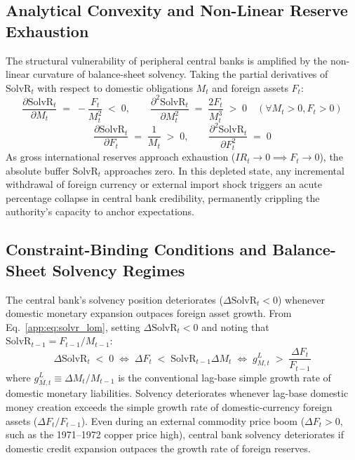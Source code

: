 \subsection{Analytical Convexity and Non-Linear Reserve Exhaustion}
\label{app:convexity}

The structural vulnerability of peripheral central banks is amplified by the non-linear curvature of balance-sheet solvency. Taking the partial derivatives of $\text{SolvR}_t$ with respect to domestic obligations $M_t$ and foreign assets $F_t$:
\begin{equation}
	\label{app:eq:solvr_derivatives}
	\frac{\partial \text{SolvR}_t}{\partial M_t} \;=\; -\frac{F_t}{M_t^2} \;<\; 0, \qquad \frac{\partial^2 \text{SolvR}_t}{\partial M_t^2} \;=\; \frac{2 F_t}{M_t^3} \;>\; 0 \quad (\forall M_t > 0, F_t > 0)
\end{equation}
\begin{equation}
	\frac{\partial \text{SolvR}_t}{\partial F_t} \;=\; \frac{1}{M_t} \;>\; 0, \qquad \frac{\partial^2 \text{SolvR}_t}{\partial F_t^2} \;=\; 0
\end{equation}
As gross international reserves approach exhaustion ($IR_t \to 0 \implies F_t \to 0$), the absolute buffer $\text{SolvR}_t$ approaches zero. In this depleted state, any incremental withdrawal of foreign currency or external import shock triggers an acute percentage collapse in central bank credibility, permanently crippling the authority's capacity to anchor expectations.

\subsection{Constraint-Binding Conditions and Balance-Sheet Solvency Regimes}
\label{app:constraint_cases}

The central bank's solvency position deteriorates ($\Delta\text{SolvR}_t < 0$) whenever domestic monetary expansion outpaces foreign asset growth. From Eq.~\eqref{app:eq:solvr_lom}, setting $\Delta\text{SolvR}_t < 0$ and noting that $\text{SolvR}_{t-1} = F_{t-1}/M_{t-1}$:
\begin{equation}
	\label{app:eq:binding}
	\Delta\text{SolvR}_t \;<\; 0 \;\iff\; \Delta F_t \;<\; \text{SolvR}_{t-1} \Delta M_t \;\iff\; g^L_{M,t} \;>\; \frac{\Delta F_t}{F_{t-1}}
\end{equation}
where $g^L_{M,t} \equiv \Delta M_t / M_{t-1}$ is the conventional lag-base simple growth rate of domestic monetary liabilities. Solvency deteriorates whenever lag-base domestic money creation exceeds the simple growth rate of domestic-currency foreign assets ($\Delta F_t / F_{t-1}$). Even during an external commodity price boom ($\Delta F_t > 0$, such as the 1971--1972 copper price high), central bank solvency deteriorates if domestic credit expansion outpaces the growth rate of foreign reserves.

